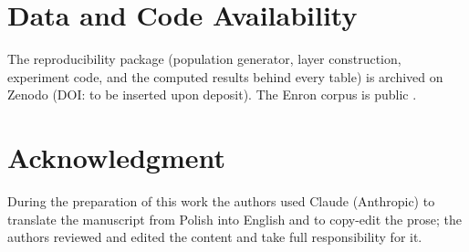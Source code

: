 \documentclass[conference]{IEEEtran}
\newif\ifanon
\begin{document}
\section*{Data and Code Availability}
\ifanon
The reproducibility package (population generator, layer construction, experiment code, and the computed
results behind every table) will be released upon acceptance. The Enron corpus is public
\cite{klimt2004enron}.
\else
The reproducibility package (population generator, layer construction, experiment code, and the computed
results behind every table) is archived on Zenodo (DOI: to be inserted upon deposit). The Enron corpus is
public \cite{klimt2004enron}.
\fi

\ifanon\else
\section*{Acknowledgment}
During the preparation of this work the authors used Claude (Anthropic) to translate the manuscript from
Polish into English and to copy-edit the prose; the authors reviewed and edited the content and take full
responsibility for it.
\fi



\end{document}
